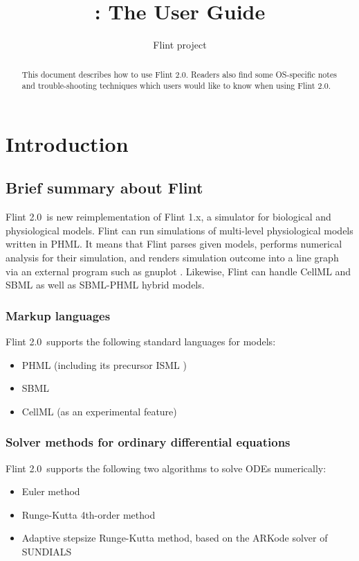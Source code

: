 \documentclass[a4paper,10pt]{report}
\title{\Flint: The User Guide}
\author{Flint project}
\def\FlintVersion{2.0}
\def\Flint{Flint \FlintVersion}
\def\Tagline{a simulator for biological and physiological models}
\begin{document}
\maketitle

\begin{abstract}
This document describes how to use \Flint.
Readers also find some OS-specific notes and trouble-shooting techniques which
users would like to know when using \Flint.
\end{abstract}

\tableofcontents



\chapter{Introduction}

\section{Brief summary about Flint}
\Flint~is new reimplementation of Flint 1.x, \Tagline.
Flint can run simulations of multi-level physiological models written in PHML.
It means that Flint parses given models, performs numerical analysis for their
simulation, and renders simulation outcome into a line graph via an external
program such as gnuplot \cite{gnuplot}.
Likewise, Flint can handle CellML and SBML as well as SBML-PHML hybrid models.

\subsection{Markup languages}
\Flint\ supports the following standard languages for models:
\begin{itemize}
\item PHML \cite{PHML} (including its precursor ISML \cite{ISML})
\item SBML \cite{SBML}
\item CellML \cite{CellML} (as an experimental feature)
\end{itemize}

\subsection{Solver methods for ordinary differential equations}
\Flint\ supports the following two algorithms to solve ODEs numerically:
\begin{itemize}
\item Euler method
\item Runge-Kutta 4th-order method
\item Adaptive stepsize Runge-Kutta method, based on the ARKode solver of
  SUNDIALS \cite{hindmarsh2005sundials}
\end{itemize}
\end{document}
